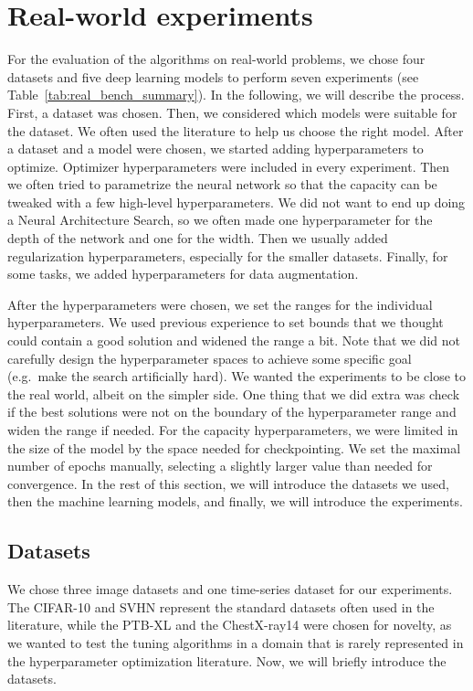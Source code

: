 \section{Real-world experiments}
For the evaluation of the algorithms on real-world problems, we chose four datasets and five deep learning models to perform seven experiments (see Table~\ref{tab:real_bench_summary}). In the following, we will describe the process. First, a dataset was chosen. Then, we considered which models were suitable for the dataset. We often used the literature to help us choose the right model. After a dataset and a model were chosen, we started adding hyperparameters to optimize. Optimizer hyperparameters were included in every experiment. Then we often tried to parametrize the neural network so that the capacity can be tweaked with a few high-level hyperparameters. We did not want to end up doing a Neural Architecture Search, so we often made one hyperparameter for the depth of the network and one for the width. Then we usually added regularization hyperparameters, especially for the smaller datasets. Finally, for some tasks, we added hyperparameters for data augmentation.

After the hyperparameters were chosen, we set the ranges for the individual hyperparameters. We used previous experience to set bounds that we thought could contain a good solution and widened the range a bit. Note that we did not carefully design the hyperparameter spaces to achieve some specific goal (e.g.\ make the search artificially hard). We wanted the experiments to be close to the real world, albeit on the simpler side. One thing that we did extra was check if the best solutions were not on the boundary of the hyperparameter range and widen the range if needed. For the capacity hyperparameters, we were limited in the size of the model by the space needed for checkpointing. We set the maximal number of epochs manually, selecting a slightly larger value than needed for convergence. In the rest of this section, we will introduce the datasets we used, then the machine learning models, and finally, we will introduce the experiments.





\subsection{Datasets}
We chose three image datasets and one time-series dataset for our experiments. The CIFAR-10 and SVHN represent the standard datasets often used in the literature, while the PTB-XL and the ChestX-ray14 were chosen for novelty, as we wanted to test the tuning algorithms in a domain that is rarely represented in the hyperparameter optimization literature. Now, we will briefly introduce the datasets.

